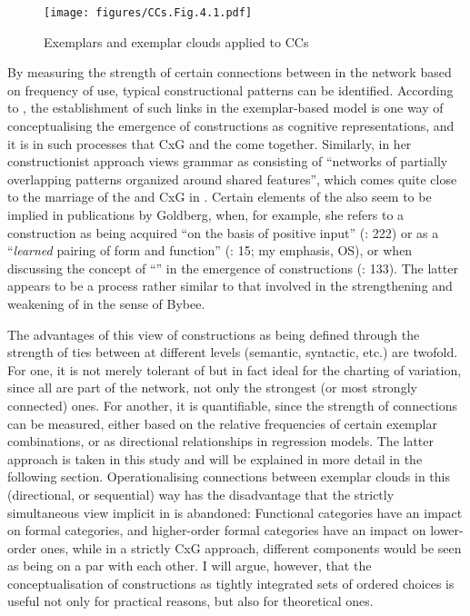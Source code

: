 \begin{figure}
\texttt{[image: figures/CCs.Fig.4.1.pdf]}
\caption{\label{bkm:Ref497025942}\label{fig:4.1}Exemplars and exemplar clouds applied to CCs}
\end{figure}

By measuring the strength of certain connections between  in the network based on frequency of use, typical constructional patterns can be identified. According to \citet[54]{Bybee2013}, the establishment of such links in the ex\-em\-plar-based model is one way of conceptualising the emergence of constructions as cognitive representations, and it is in such processes that CxG and the  come together. Similarly, \citet[50]{Fried2008} in her constructionist approach views grammar as consisting of “networks of partially overlapping patterns organized around shared features”, which comes quite close to the marriage of the  and CxG in \citet{Bybee2013}. Certain elements of the  also seem to be implied in publications by Goldberg, when, for example, she refers to a construction as being acquired “on the basis of positive input” (\citeyear{Goldberg2003}: 222) or as a “\textit{learned} pairing of form and function” (\citealt{Goldberg2013}: 15; my emphasis, OS), or when discussing the concept of “” in the emergence of constructions (\citeyear{Goldberg2011}: 133). The latter appears to be a process rather similar to that involved in the strengthening and weakening of  in the sense of Bybee.

The advantages of this view of constructions as being defined through the strength of ties between  at different levels (semantic, syntactic, etc.) are twofold. For one, it is not merely tolerant of but in fact ideal for the charting of variation, since all  are part of the network, not only the strongest (or most strongly connected) ones. For another, it is quantifiable, since the strength of connections can be measured, either based on the relative frequencies of certain exemplar combinations, or as directional relationships in regression models. The latter approach is taken in this study and will be explained in more detail in the following section. Operationalising connections between exemplar clouds in this (directional, or sequential) way has the disadvantage that the strictly simultaneous view implicit in  is abandoned: Functional categories have an impact on formal categories, and higher-order formal categories have an impact on lower-order ones, while in a strictly CxG approach, different components would be seen as being on a par with each other. I will argue, however, that the conceptualisation of constructions as tightly integrated sets of ordered choices is useful not only for practical reasons, but also for theoretical ones.

